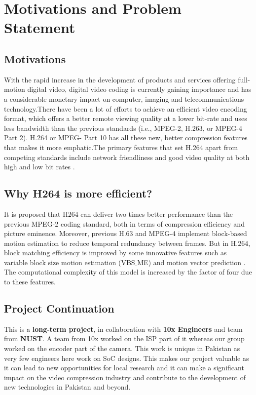 
\chapter{Motivations and Problem Statement} %
\label{Chapter2}

\section{Motivations}

With the rapid increase in the development of products and services offering full-motion digital video, digital video coding is currently gaining importance and has a considerable monetary impact on computer, imaging and telecommunications technology.There have been a lot of efforts to achieve an efficient video encoding format, which offers a better remote viewing quality at a lower bit-rate and uses less bandwidth than the previous standards (i.e., MPEG-2, H.263, or MPEG-4 Part 2). H.264 or MPEG- Part 10 has all these new, better compression features that makes it more emphatic.The primary features that set H.264 apart from competing standards include network friendliness and good video quality at both high and low bit rates \cite{amer2005high}.

\section{Why H264 is more efficient?}

It is proposed that H264 can deliver two times better performance than the previous MPEG-2 coding standard, both in terms of compression efficiency and picture eminence. Moreover, previous H.63 and MPEG-4 implement block-based motion estimation to reduce temporal redundancy between frames. But in H.264, block matching efficiency is improved by some innovative features such as variable block size motion estimation (VBS$\_$ME) and motion vector prediction \cite{li2003serial}. The computational complexity of this model is increased by the factor of four due to these features.

\section{Project Continuation}

This is a \textbf{long-term project}, in collaboration with \textbf{10x Engineers} and team from \textbf{NUST}. A team from 10x worked on the ISP part of it whereas our group worked on the encoder part of the camera. This work is unique in Pakistan as very few engineers here work on SoC designs. This makes our project valuable as it can lead to new opportunities for local research and it can make a significant impact on the video compression industry and contribute to the development of new technologies in Pakistan and beyond.

